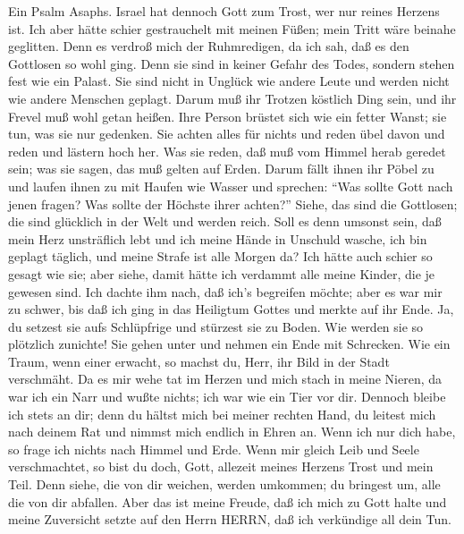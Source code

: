  Ein Psalm Asaphs. Israel hat dennoch Gott zum Trost, wer
nur reines Herzens ist.  Ich aber hätte schier gestrauchelt
mit meinen Füßen; mein Tritt wäre beinahe geglitten.  Denn
es verdroß mich der Ruhmredigen, da ich sah, daß es den Gottlosen so
wohl ging.  Denn sie sind in keiner Gefahr des Todes,
sondern stehen fest wie ein Palast.  Sie sind nicht in
Unglück wie andere Leute und werden nicht wie andere Menschen geplagt.
 Darum muß ihr Trotzen köstlich Ding sein, und ihr Frevel
muß wohl getan heißen.  Ihre Person brüstet sich wie ein
fetter Wanst; sie tun, was sie nur gedenken.  Sie achten
alles für nichts und reden übel davon und reden und lästern hoch her.
 Was sie reden, daß muß vom Himmel herab geredet sein; was
sie sagen, das muß gelten auf Erden.  Darum fällt ihnen ihr
Pöbel zu und laufen ihnen zu mit Haufen wie Wasser  und
sprechen: ``Was sollte Gott nach jenen fragen? Was sollte der Höchste
ihrer achten?''  Siehe, das sind die Gottlosen; die sind
glücklich in der Welt und werden reich.  Soll es denn
umsonst sein, daß mein Herz unsträflich lebt und ich meine Hände in
Unschuld wasche,  ich bin geplagt täglich, und meine Strafe
ist alle Morgen da?  Ich hätte auch schier so gesagt wie
sie; aber siehe, damit hätte ich verdammt alle meine Kinder, die je
gewesen sind.  Ich dachte ihm nach, daß ich's begreifen
möchte; aber es war mir zu schwer,  bis daß ich ging in das
Heiligtum Gottes und merkte auf ihr Ende.  Ja, du setzest
sie aufs Schlüpfrige und stürzest sie zu Boden.  Wie werden
sie so plötzlich zunichte! Sie gehen unter und nehmen ein Ende mit
Schrecken.  Wie ein Traum, wenn einer erwacht, so machst
du, Herr, ihr Bild in der Stadt verschmäht.  Da es mir wehe
tat im Herzen und mich stach in meine Nieren,  da war ich
ein Narr und wußte nichts; ich war wie ein Tier vor dir. 
Dennoch bleibe ich stets an dir; denn du hältst mich bei meiner rechten
Hand,  du leitest mich nach deinem Rat und nimmst mich
endlich in Ehren an.  Wenn ich nur dich habe, so frage ich
nichts nach Himmel und Erde.  Wenn mir gleich Leib und
Seele verschmachtet, so bist du doch, Gott, allezeit meines Herzens
Trost und mein Teil.  Denn siehe, die von dir weichen,
werden umkommen; du bringest um, alle die von dir abfallen.
 Aber das ist meine Freude, daß ich mich zu Gott halte und
meine Zuversicht setzte auf den Herrn HERRN, daß ich verkündige all dein
Tun.

